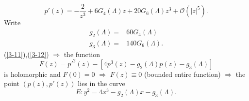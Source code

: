 \begin{equation}\label{3-12}
  p'(z)=-\frac{2}{z^3}+6G_4(\Lambda)z+20 G_6(\Lambda)z^3+\mathcal{O}(|z|^{5}).
\end{equation}
Write 
\begin{align*}
  g_2(\Lambda)=&60G_4(\Lambda)\\
  g_3(\Lambda)=&140 G_6(\Lambda)
.\end{align*}
(\ref{3-11}),(\ref{3-12}) $\Rightarrow$ the function
\[
  F(z)=p'^{2}(z)-\left[ 4p^3(z)-g_2(\Lambda)p(z)-g_3(\Lambda) \right] 
\] 
is holomorphic and $F(0)=0$  $\Rightarrow$ $F(z)\equiv 0$ (bounded entire function) $\Rightarrow$ the point $\left(p(z),p'(z)\right)$ lies in the curve
\begin{equation}
  E: y^2=4x^3-g_2(\Lambda)x-g_3(\Lambda).
\end{equation}

